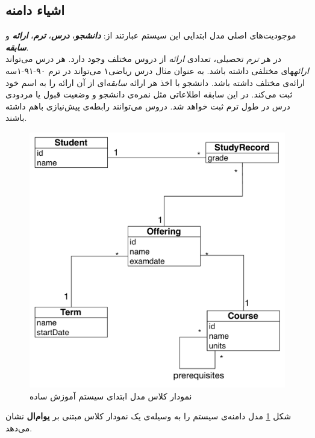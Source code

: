 \subsection{اشیاء دامنه}
\label{subsec:mainEntities}
 موجودیت‌های اصلی  مدل ابتدایی این سیستم عبارتند از:
\textbf{\textit{دانشجو}}، \textbf{\textit{درس}}، \textbf{\textit{ترم}}، \textbf{\textit{ارائه}} و \textbf{\textit{سابقه}}.\\
در هر \textit{ترم} تحصیلی، تعدادی \textit{ارائه} از دروس مختلف وجود دارد. هر درس می‌تواند \textit{ارائه}های مختلفی داشته باشد. به عنوان مثال درس ریاضی۱ می‌تواند در ترم ۹۰-۹۱-۱سه ارائه‌ی مختلف داشته باشد. دانشجو با اخذ هر ارائه \textit{سابقه}‌ای از آن ارائه را به اسم خود ثبت می‌کند. در این سابقه اطلاعاتی مثل نمره‌ی دانشجو و وضعیت قبول یا مردودی درس در طول ترم ثبت خواهد شد. دروس می‌توانند رابطه‌ی پیش‌نیازی باهم داشته باشند. 
\begin{figure}
    \begin{center}
	\includegraphics[width=12cm]{4-ProposedFramework/Figures/SimpleClassDiagram.pdf}
    \end{center}
    \caption{\label{fig:edu_class1} نمودار کلاس مدل ابتدای سیستم آموزش ساده }
\end{figure}
شکل \ref{fig:edu_class1} مدل دامنه‌ی سیستم را به وسیله‌ی یک نمودار کلاس مبتنی بر \textbf{یو‌ام‌ال} نشان می‌دهد.


